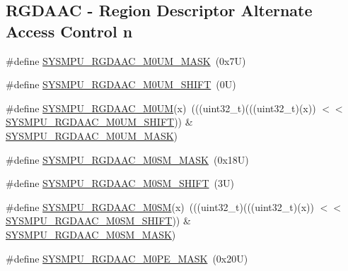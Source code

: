 \subsection*{R\+G\+D\+A\+AC -\/ Region Descriptor Alternate Access Control n}
\begin{DoxyCompactItemize}
\item 
\#define \mbox{\hyperlink{group___s_y_s_m_p_u___register___masks_ga54303a9e2048685dc4cb2bacd7f29580}{S\+Y\+S\+M\+P\+U\+\_\+\+R\+G\+D\+A\+A\+C\+\_\+\+M0\+U\+M\+\_\+\+M\+A\+SK}}~(0x7\+U)
\item 
\#define \mbox{\hyperlink{group___s_y_s_m_p_u___register___masks_ga87c8892fc77a1d99f3a2d2c8824cc0a8}{S\+Y\+S\+M\+P\+U\+\_\+\+R\+G\+D\+A\+A\+C\+\_\+\+M0\+U\+M\+\_\+\+S\+H\+I\+FT}}~(0\+U)
\item 
\#define \mbox{\hyperlink{group___s_y_s_m_p_u___register___masks_ga64c8b329954152a68f91ea0493c14f93}{S\+Y\+S\+M\+P\+U\+\_\+\+R\+G\+D\+A\+A\+C\+\_\+\+M0\+UM}}(x)~(((uint32\+\_\+t)(((uint32\+\_\+t)(x)) $<$$<$ \mbox{\hyperlink{group___s_y_s_m_p_u___register___masks_ga87c8892fc77a1d99f3a2d2c8824cc0a8}{S\+Y\+S\+M\+P\+U\+\_\+\+R\+G\+D\+A\+A\+C\+\_\+\+M0\+U\+M\+\_\+\+S\+H\+I\+FT}})) \& \mbox{\hyperlink{group___s_y_s_m_p_u___register___masks_ga54303a9e2048685dc4cb2bacd7f29580}{S\+Y\+S\+M\+P\+U\+\_\+\+R\+G\+D\+A\+A\+C\+\_\+\+M0\+U\+M\+\_\+\+M\+A\+SK}})
\item 
\#define \mbox{\hyperlink{group___s_y_s_m_p_u___register___masks_ga3abe927f5b1ee907e04e879ee8b7bde3}{S\+Y\+S\+M\+P\+U\+\_\+\+R\+G\+D\+A\+A\+C\+\_\+\+M0\+S\+M\+\_\+\+M\+A\+SK}}~(0x18\+U)
\item 
\#define \mbox{\hyperlink{group___s_y_s_m_p_u___register___masks_ga1e07b43327cea07589170831cf01c1d2}{S\+Y\+S\+M\+P\+U\+\_\+\+R\+G\+D\+A\+A\+C\+\_\+\+M0\+S\+M\+\_\+\+S\+H\+I\+FT}}~(3\+U)
\item 
\#define \mbox{\hyperlink{group___s_y_s_m_p_u___register___masks_ga168e6cdaadec7c56296f480c6bc2d002}{S\+Y\+S\+M\+P\+U\+\_\+\+R\+G\+D\+A\+A\+C\+\_\+\+M0\+SM}}(x)~(((uint32\+\_\+t)(((uint32\+\_\+t)(x)) $<$$<$ \mbox{\hyperlink{group___s_y_s_m_p_u___register___masks_ga1e07b43327cea07589170831cf01c1d2}{S\+Y\+S\+M\+P\+U\+\_\+\+R\+G\+D\+A\+A\+C\+\_\+\+M0\+S\+M\+\_\+\+S\+H\+I\+FT}})) \& \mbox{\hyperlink{group___s_y_s_m_p_u___register___masks_ga3abe927f5b1ee907e04e879ee8b7bde3}{S\+Y\+S\+M\+P\+U\+\_\+\+R\+G\+D\+A\+A\+C\+\_\+\+M0\+S\+M\+\_\+\+M\+A\+SK}})
\item 
\#define \mbox{\hyperlink{group___s_y_s_m_p_u___register___masks_ga93284d1a0a0c34dad8a07e15fa24041a}{S\+Y\+S\+M\+P\+U\+\_\+\+R\+G\+D\+A\+A\+C\+\_\+\+M0\+P\+E\+\_\+\+M\+A\+SK}}~(0x20\+U)

\end{DoxyCompactItemize}
